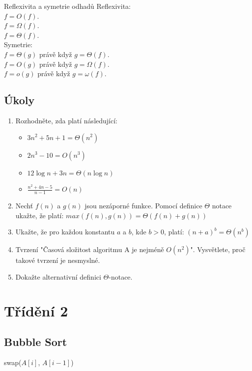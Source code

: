 \documentclass[openany,12pt,a4paper]{book}
\begin{document}
\begin{pseudocodecardorange}{Reflexivita a symetrie odhadů}
Reflexivita:\\
$f = O(f).$\\
$f = \Omega(f).$\\
$f = \Theta(f).$\\
Symetrie:\\
$f = \Theta(g)$ právě když $g = \Theta(f)$.\\
$f = O(g)$ právě když $g = \Omega(f)$.\\
$f = o(g)$ právě když $g = \omega(f)$.\\
\end{pseudocodecardorange}




\section{Úkoly}
\begin{enumerate}
	\item Rozhodněte, zda platí následující: 
		 \begin{itemize}
		 	\item $3n^2 + 5n + 1 = \Theta(n^2)$
		 	\item $2n^3 - 10 = O(n^3)$
		 	\item $12 \log{n} + 3n = \Theta(n \log n)$
		 	\item $\frac{n^2 + 4n - 5}{n - 1} = O(n)$
		 \end{itemize}
	\item Nechť $f(n)$ a $g(n)$ jsou nezáporné funkce. Pomocí definice $\Theta$ notace ukažte, že platí: $max(f(n), g(n)) = \Theta(f(n) + g(n))$
	\item Ukažte, že pro každou konstantu $a$ a $b$, kde $b > 0$, platí: $(n + a)^b = \Theta(n^b)$
	\item Tvrzení "Časová složitost algoritmu A je nejméně $O(n^2)$". Vysvětlete, proč takové tvrzení je nesmyslné.
	\item Dokažte alternativní definici $\Theta$-notace.
	 
\end{enumerate}




\chapter{Třídění 2}

\section{Bubble Sort}
\begin{algorithm}
\caption{Bubble Sort(A)}
\begin{algorithmic}[1]
                \State swap($A[i]$, $A[i - 1]$)
            \EndIf
        \EndFor
    \EndFor
\end{algorithmic}
\end{algorithm}
\end{document}
